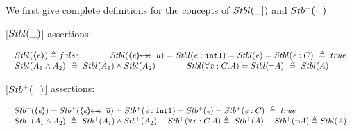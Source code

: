 
We first give complete definitions for the concepts of $  {Stbl( \_] )}$ and ${Stb^+( \_ )}$

\vspace{.2cm}

\begin{definition}
\label{def:Basic}
[${Stbl( \_ )}$] assertions: %

$
\begin{array}{l}
 \begin{array}{lll}
  \Stable {\inside{\re}}  \triangleq  false & \lclSPACE &   \Stable {\protectedFrom \re {\overline {u}}} =  
  \Stable  {\internal \re} =  %
    \Stable {\re}=   
     \Stable {\re:C}\   \triangleq \    true
 \end{array}
  \\
 \begin{array}{lcl}
 \Stable  {A_1  \wedge  A_2}\  \triangleq\     \Stable  { A_1}  \wedge    \Stable  {A_2}    &
\lclSPACE  &  
 \Stable  {\forall x:C.A} =\Stable  {\neg A} \   \triangleq\   \Stable A
 \end{array}
 \end{array}
$
\label{f:Basic}
 \end{definition}


 \begin{definition}
[${Stb^+( \_ )}$] assertions: %

$
\begin{array}{l}
 \begin{array}{l}
  \Pos {\inside{\re}} =  \Pos {\protectedFrom \re {\overline {u}}} =  
  \Pos  {\internal \re} =   
    \Pos {\re}=   
     \Pos {\re:C}\   \triangleq \    true
 \end{array}
  \\
 \begin{array}{lll}
 \Pos  {A_1  \wedge  A_2}\  \triangleq\     \Pos  { A_1}  \wedge    \Pos  {A_2}   \  &    
 \Pos  {\forall x:C.A}   \triangleq\   \Pos A
\   &
  \Pos {\neg A}  \triangleq \Stable A %
 \end{array}
 \end{array}
 $
 \label{def:Pos}
\end{definition}

